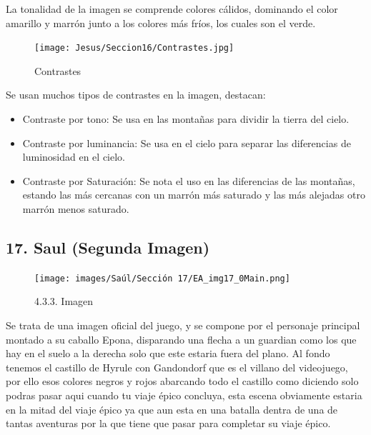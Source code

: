 \documentclass[12pt]{article}
\begin{document}
          La tonalidad de la imagen se comprende colores cálidos, dominando el color amarillo y marrón junto a los colores más fríos, los cuales son el verde.

          \begin{figure}[H]
            \centering
            \texttt{[image: Jesus/Seccion16/Contrastes.jpg]}
            \caption{Contrastes}
          \end{figure} 

          Se usan muchos tipos de contrastes en la imagen, destacan: 
          \begin{itemize}
            \item Contraste por tono: Se usa en las montañas para dividir la tierra del cielo.
            \item Contraste por luminancia: Se usa en el cielo para separar las diferencias de luminosidad en el cielo. 
            \item Contraste por Saturación: Se nota el uso en las diferencias de las montañas, estando las más cercanas con un marrón más saturado y las más alejadas otro marrón menos saturado.
          \end{itemize}
          
        \newpage


  \subsection{17. Saul (Segunda Imagen)}
    \begin{figure}[H]
      \centering
      \texttt{[image: images/Saúl/Sección 17/EA\_img17\_0Main.png]}
      \caption{\small 4.3.3. Imagen}
    \end{figure}
    Se trata de una imagen oficial del juego, y se compone por el personaje principal montado a su caballo Epona, disparando una flecha a un guardian como los que hay en el suelo a la derecha solo que este estaria fuera del plano. Al fondo tenemos el castillo de Hyrule con Gandondorf que es el villano del videojuego, por ello esos colores negros y rojos abarcando todo el castillo como diciendo solo podras pasar aqui cuando tu viaje épico concluya, esta escena obviamente estaria en la mitad del viaje épico ya que aun esta en una batalla dentra de una de tantas aventuras por la que tiene que pasar para completar su viaje épico.
\end{document}
